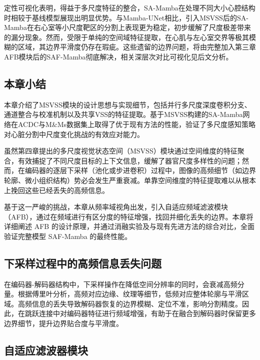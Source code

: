 \documentclass[12pt, a4paper, twoside]{article}
\begin{document}
定性可视化表明，得益于多尺度特征的整合，SA-Mamba在处理不同大小心腔结构时相较于基线模型展现出明显优势。与Mamba-UNet相比，引入MSVSS后的SA-Mamba在右心室等小尺度靶区的分割上表现更为稳定，初步缓解了尺度极差带来的漏分现象。然而，受限于单纯的空间域特征提取，在心肌与左心室交界等极其模糊的区域，其边界平滑度仍存在瑕疵。这些遗留的边界问题，将由完整加入第三章AFB模块后的SAF-Mamba彻底解决，相关深层次对比可视化见后文分析。

\subsection{本章小结}

本章介绍了MSVSS模块的设计思想与实现细节，包括并行多尺度深度卷积分支、通道整合与校准机制以及共享VSS的特征提取。基于MSVSS构建的SA-Mamba网络在ACDC与M\&Ms数据集上取得了优于现有方法的性能，验证了多尺度感知策略对心脏分割中尺度变化挑战的有效应对能力。


虽然第四章提出的多尺度视觉状态空间（MSVSS）模块通过空间维度的特征聚合，有效捕捉了不同尺度目标的上下文信息，缓解了器官尺度多样性的问题；然而，在编码器的逐层下采样（池化或步进卷积）过程中，图像的高频细节（如边界轮廓、微小组织结构）势必会发生严重衰减。单靠空间维度的特征提取难以从根本上挽回这些已经丢失的高频信息。

基于这一严峻的挑战，本章从频率域视角出发，引入自适应频域滤波模块（AFB），通过在频域进行有区分度的特征增强，找回并细化丢失的边界。本章将详细阐述 AFB 的设计原理，并通过消融实验及与现有先进方法的综合对比，全面验证完整模型 SAF-Mamba 的最终性能。

\subsection{下采样过程中的高频信息丢失问题}

在编码器-解码器结构中，下采样操作在降低空间分辨率的同时，会衰减高频分量。根据傅里叶分析，高频对应边缘、纹理等细节，低频对应整体轮廓与平滑区域。高频信息的丢失导致解码器恢复的边界模糊、定位不准，影响分割精度。因此，在跳跃连接中对编码器特征进行频域增强，有助于在融合到解码器时保留更多边界细节，提升边界贴合度与平滑度。

\subsection{自适应滤波器模块}
\end{document}
